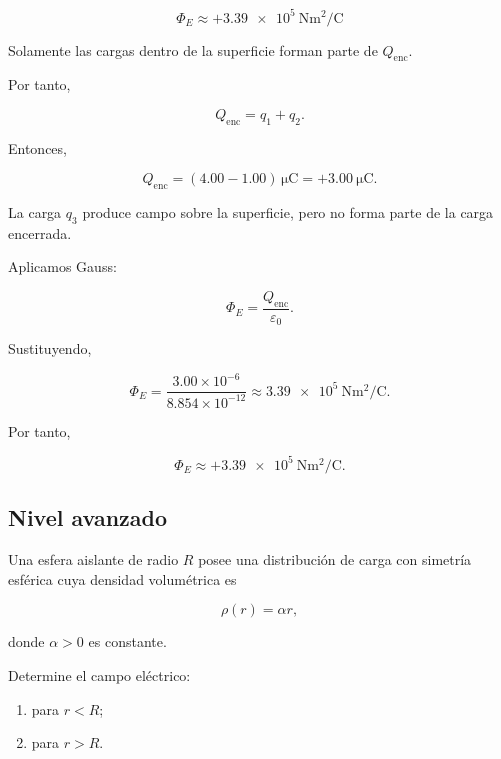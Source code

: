 \begin{respuesta}

\[
\boxed{
\Phi_E\approx
+\SI{3.39e5}{\newton\metre\squared\per\coulomb}
}
\]

\end{respuesta}

\begin{explicacion}

Solamente las cargas dentro de la superficie forman parte de \(Q_{\text{enc}}\).

Por tanto,

\[
Q_{\text{enc}}=q_1+q_2.
\]

Entonces,

\[
Q_{\text{enc}}
=(4.00-1.00)\,\si{\micro\coulomb}
=
+\SI{3.00}{\micro\coulomb}.
\]

La carga \(q_3\) produce campo sobre la superficie, pero no forma parte de la carga
encerrada.

Aplicamos Gauss:

\[
\Phi_E=\frac{Q_{\text{enc}}}{\varepsilon_0}.
\]

Sustituyendo,

\[
\Phi_E=
\frac{3.00\times10^{-6}}{8.854\times10^{-12}}
\approx
\SI{3.39e5}{\newton\metre\squared\per\coulomb}.
\]

Por tanto,

\[
\boxed{
\Phi_E\approx
+\SI{3.39e5}{\newton\metre\squared\per\coulomb}
}.
\]

\end{explicacion}


\subsection{Nivel avanzado}

\begin{ejercicio}

Una esfera aislante de radio \(R\) posee una distribución de carga con simetría
esférica cuya densidad volumétrica es

\[
\rho(r)=\alpha r,
\]

donde \(\alpha>0\) es constante.

Determine el campo eléctrico:

\begin{enumerate}
    \item para \(r<R\);
    \item para \(r>R\).
\end{enumerate}

\end{ejercicio}

